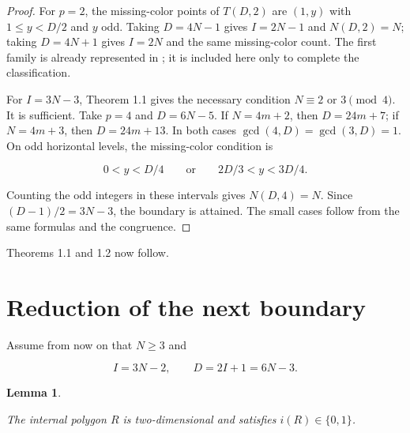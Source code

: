 \documentclass[11pt]{article}
\newtheorem{lemma}[theorem]{Lemma}
\theoremstyle{remark}
\numberwithin{equation}{section}
\begin{document}
\begin{proof}

For $p=2$, the missing-color points of $T(D,2)$ are $(1,y)$ with $1\le y<D/2$ and $y$ odd. Taking $D=4N-1$ gives $I=2N-1$ and $N(D,2)=N$; taking $D=4N+1$ gives $I=2N$ and the same missing-color count. The first family is already represented in \cite[Figure~6]{ref2}; it is included here only to complete the classification.

For $I=3N-3$, Theorem 1.1 gives the necessary condition $N\equiv2$ or $3\pmod4$. It is sufficient. Take $p=4$ and $D=6N-5$. If $N=4m+2$, then $D=24m+7$; if $N=4m+3$, then $D=24m+13$. In both cases $\gcd(4,D)=\gcd(3,D)=1$. On odd horizontal levels, the missing-color condition is

\[
0<y<D/4\qquad\text{or}\qquad2D/3<y<3D/4.
\]

Counting the odd integers in these intervals gives $N(D,4)=N$. Since $(D-1)/2=3N-3$, the boundary is attained. The small cases follow from the same formulas and the congruence.
\end{proof}


Theorems 1.1 and 1.2 now follow.

\section{Reduction of the next boundary}


Assume from now on that $N\ge3$ and

\[
I=3N-2,\qquad D=2I+1=6N-3.
\]

\begin{lemma}\label{lem:next-reduction}

The internal polygon $R$ is two-dimensional and satisfies $i(R)\in\{0,1\}$.

\end{lemma}
\end{document}
